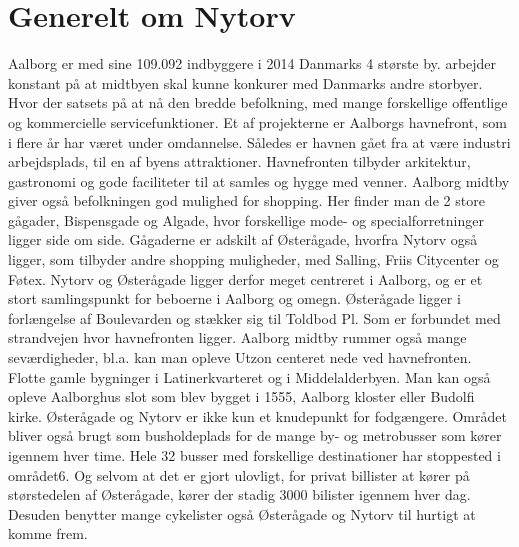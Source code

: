 \section{Generelt om Nytorv}
\label{sec:generelt_om_nytorv}
Aalborg er med sine 109.092 indbyggere i 2014 Danmarks 4 største by.%
arbejder konstant på at midtbyen skal kunne konkurer med Danmarks andre storbyer. Hvor der 
satsets på at nå den bredde befolkning, med mange forskellige offentlige og kommercielle 
servicefunktioner.
Et af projekterne er Aalborgs havnefront, som i flere år har været under omdannelse. Således er havnen gået fra at være industri arbejdsplads, til en af byens attraktioner. Havnefronten tilbyder arkitektur, gastronomi og gode faciliteter til at samles og hygge med venner.
Aalborg midtby giver også befolkningen god mulighed for shopping. Her finder man de 2 store 
gågader, Bispensgade og Algade, hvor forskellige mode- og specialforretninger ligger side om side. Gågaderne er adskilt af Østerågade, hvorfra Nytorv også ligger, som tilbyder andre shopping muligheder, med Salling, Friis Citycenter og Føtex.
Nytorv og Østerågade ligger derfor meget centreret i Aalborg, og er et stort samlingspunkt for beboerne i Aalborg og omegn. Østerågade ligger i forlængelse af Boulevarden og stækker sig til Toldbod Pl. Som er forbundet med strandvejen hvor havnefronten ligger. Aalborg midtby rummer også mange seværdigheder, bl.a. kan man opleve Utzon centeret nede ved havnefronten. Flotte gamle bygninger i Latinerkvarteret og i Middelalderbyen. Man kan også opleve Aalborghus slot som blev bygget i 1555, Aalborg kloster eller Budolfi kirke.
Østerågade og Nytorv er ikke kun et knudepunkt for fodgængere. Området bliver også brugt som busholdeplads for de mange by- og metrobusser som kører igennem hver time. Hele 32 busser med forskellige destinationer har stoppested i området6. Og selvom at det er gjort ulovligt, for privat billister at kører på størstedelen af Østerågade, kører der stadig 3000 bilister igennem hver dag. Desuden benytter mange cykelister også Østerågade og Nytorv til hurtigt at komme frem.

